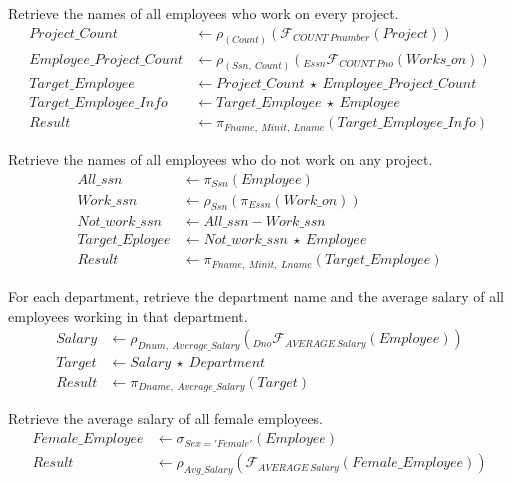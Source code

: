 \documentclass[12pt,letterpaper,titlepage,en-US]{article}
\begin{document}
\begin{homeworkProblem}
Retrieve the names of all employees who work on every project.
\begin{align*}
    Project\_Count & \leftarrow \rho_{(Count)}(\mathcal{F}_{COUNT\ Pnumber}(Project)) \\
    Employee\_Project\_Count & \leftarrow \rho_{(Ssn,\ Count)}(_{Essn}\mathcal{F}_{COUNT\ Pno}(Works\_on)) \\
    Target\_Employee & \leftarrow Project\_Count\ \star\ Employee\_Project\_Count \\
    Target\_Employee\_Info & \leftarrow Target\_Employee\ \star\ Employee \\
    Result & \leftarrow \pi_{Fname,\  Minit,\ Lname}(Target\_Employee\_Info)
\end{align*}
\end{homeworkProblem}

\begin{homeworkProblem}
Retrieve the names of all employees who do not work on any project.
\begin{align*}
    All\_ssn & \leftarrow \pi_{Ssn}(Employee) \\
    Work\_ssn & \leftarrow \rho_{Ssn}(\pi_{Essn}(Work\_on)) \\
    Not\_work\_ssn & \leftarrow All\_ssn - Work\_ssn \\
    Target\_Eployee & \leftarrow Not\_work\_ssn\ \star\ Employee \\
    Result & \leftarrow \pi_{Fname,\ Minit,\ Lname}(Target\_Employee)
\end{align*}
\end{homeworkProblem}

\begin{homeworkProblem}
For each department, retrieve the department name and the average salary of all employees working in that department.
\begin{align*}
    Salary & \leftarrow \rho_{Dnum,\ Average\_Salary}(_{Dno}\mathcal{F}_{AVERAGE\ Salary}(Employee)) \\
    Target & \leftarrow Salary\ \star\ Department \\
    Result & \leftarrow \pi_{Dname,\ Average\_Salary}(Target)
\end{align*}
\end{homeworkProblem}

\begin{homeworkProblem}
Retrieve the average salary of all female employees.
\begin{align*}
    Female\_Employee & \leftarrow \sigma_{Sex='Female'}(Employee) \\
    Result & \leftarrow \rho_{Avg\_Salary}(\mathcal{F}_{AVERAGE\ Salary}(Female\_Employee))
\end{align*}
\end{homeworkProblem}
\end{document}
